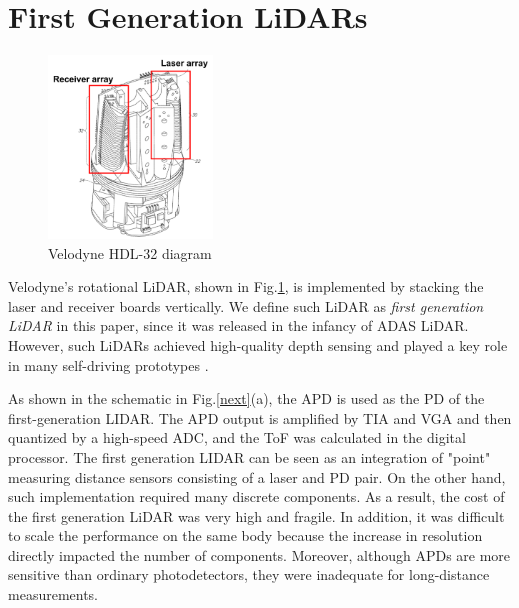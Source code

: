 \documentclass[paper]{ieice}
\begin{document}
\section{First Generation LiDARs}
\begin{figure}[!t]
\centering
 \includegraphics[width=0.39\textwidth]{figs/velo.png}
  \caption{Velodyne HDL-32 diagram \cite{velopatent}}
\label{velo}
\end{figure}

\qquad Velodyne's rotational LiDAR\cite{velodyne, velopatent}, shown in Fig.\ref{velo}, is implemented by stacking the laser and receiver boards vertically.
We define such LiDAR as \textit{first generation LiDAR} in this paper, since it was released in the infancy of ADAS LiDAR. However, such LiDARs achieved high-quality depth sensing and played a key role in many self-driving prototypes \cite{montemerlo2008junior}.

As shown in the schematic in Fig.\ref{next}(a), the APD is used as the PD of the first-generation LIDAR. The APD output is amplified by TIA and VGA and then quantized by a high-speed ADC, and the ToF was calculated in the digital processor.
The first generation LIDAR can be seen as an integration of "point" measuring distance sensors consisting of a laser and PD pair.
On the other hand, such implementation required many discrete components. As a result, the cost of the first generation LiDAR was very high and fragile. In addition, it was difficult to scale the performance on the same body because the increase in resolution directly impacted the number of components. Moreover, although APDs are more sensitive than ordinary photodetectors, they were inadequate for long-distance measurements.

\end{document}
